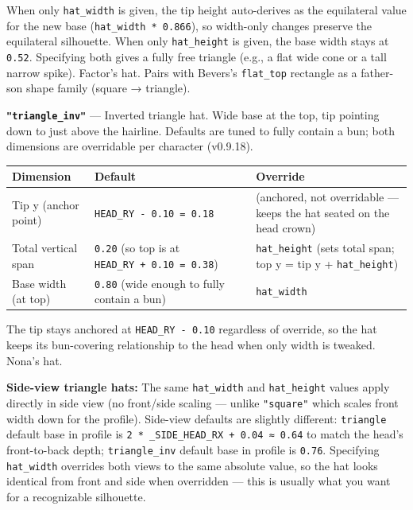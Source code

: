\documentclass[
  11pt,
]{book}
\begin{document}
When only \texttt{hat\_width} is given, the tip height auto-derives as
the equilateral value for the new base (\texttt{hat\_width\ *\ 0.866}),
so width-only changes preserve the equilateral silhouette. When only
\texttt{hat\_height} is given, the base width stays at \texttt{0.52}.
Specifying both gives a fully free triangle (e.g., a flat wide cone or a
tall narrow spike). Factor's hat. Pairs with Bevers's \texttt{flat\_top}
rectangle as a father-son shape family (square → triangle).

\textbf{\texttt{"triangle\_inv"}} --- Inverted triangle hat. Wide base
at the top, tip pointing down to just above the hairline. Defaults are
tuned to fully contain a bun; both dimensions are overridable per
character (v0.9.18).

\begin{longtable}[]{@{}
  >{\raggedright\arraybackslash}p{}
  >{\raggedright\arraybackslash}p{}
  >{\raggedright\arraybackslash}p{}@{}}
\toprule\noalign{}
Dimension & Default & Override \\
\midrule\noalign{}
\endhead
\bottomrule\noalign{}
\endlastfoot
Tip y (anchor point) & \texttt{HEAD\_RY\ -\ 0.10\ =\ 0.18} & (anchored,
not overridable --- keeps the hat seated on the head crown) \\
Total vertical span & \texttt{0.20} (so top is at
\texttt{HEAD\_RY\ +\ 0.10\ =\ 0.38}) &
\texttt{hat\_height} (sets total span; top y = tip y +
\texttt{hat\_height}) \\
Base width (at top) & \texttt{0.80} (wide enough to fully contain a
bun) & \texttt{hat\_width} \\
\end{longtable}

The tip stays anchored at \texttt{HEAD\_RY\ -\ 0.10} regardless of
override, so the hat keeps its bun-covering relationship to the head
when only width is tweaked. Nona's hat.

\textbf{Side-view triangle hats:} The same \texttt{hat\_width} and
\texttt{hat\_height} values apply directly in side view (no front/side
scaling --- unlike \texttt{"square"} which scales front width down for
the profile). Side-view defaults are slightly different:
\texttt{triangle} default base in profile is
\texttt{2\ *\ \_SIDE\_HEAD\_RX\ +\ 0.04\ ≈\ 0.64} to match the head's
front-to-back depth; \texttt{triangle\_inv} default base in profile is
\texttt{0.76}. Specifying \texttt{hat\_width} overrides both views to
the same absolute value, so the hat looks identical from front and
side when overridden --- this is usually what you want for a
recognizable silhouette.
\end{document}
